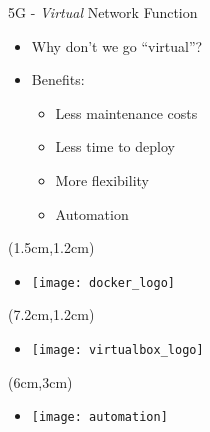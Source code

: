 \begin{frame}{5G - \textit{Virtual} Network Function}
  \begin{itemize}
    \item[]<1-> Why don't we go ``virtual''?
  \end{itemize}

  \begin{itemize}
  \item[]<2-> Benefits:
    \begin{itemize}
    \item<3-> Less maintenance costs
    \item<4-> Less time to deploy
    \item<5-> More flexibility
    \item<6-> Automation
    \end{itemize}
  \end{itemize}



  \begin{textblock*}{5cm}(1.5cm,1.2cm)
    \begin{itemize}
    \item[]<2-> \texttt{[image: docker\_logo]}
    \end{itemize}
  \end{textblock*}

  \begin{textblock*}{5cm}(7.2cm,1.2cm)
    \begin{itemize}
    \item[]<3-> \texttt{[image: virtualbox\_logo]}
    \end{itemize}
  \end{textblock*}

  \begin{textblock*}{5cm}(6cm,3cm)
    \begin{itemize}
    \item[]<6-> \texttt{[image: automation]}
    \end{itemize}
  \end{textblock*}
\end{frame}

